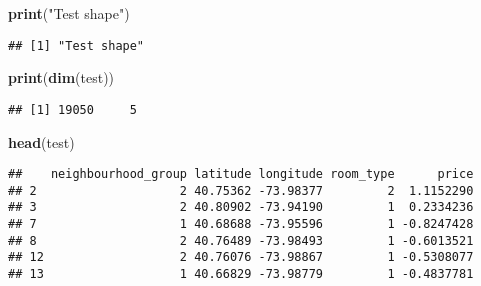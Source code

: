 \documentclass[
]{article}
\newenvironment{Shaded}{\begin{snugshade}}{\end{snugshade}}
\newcommand{\KeywordTok}[1]{\textcolor[rgb]{0.13,0.29,0.53}{\textbf{#1}}}
\newcommand{\NormalTok}[1]{#1}
\newcommand{\StringTok}[1]{\textcolor[rgb]{0.31,0.60,0.02}{#1}}
\begin{document}
\begin{Shaded}
\begin{Highlighting}[]
\KeywordTok{print}\NormalTok{(}\StringTok{"Test shape"}\NormalTok{)}
\end{Highlighting}
\end{Shaded}

\begin{verbatim}
## [1] "Test shape"
\end{verbatim}

\begin{Shaded}
\begin{Highlighting}[]
\KeywordTok{print}\NormalTok{(}\KeywordTok{dim}\NormalTok{(test))}
\end{Highlighting}
\end{Shaded}

\begin{verbatim}
## [1] 19050     5
\end{verbatim}

\begin{Shaded}
\begin{Highlighting}[]
\KeywordTok{head}\NormalTok{(test)}
\end{Highlighting}
\end{Shaded}

\begin{verbatim}
##    neighbourhood_group latitude longitude room_type      price
## 2                    2 40.75362 -73.98377         2  1.1152290
## 3                    2 40.80902 -73.94190         1  0.2334236
## 7                    1 40.68688 -73.95596         1 -0.8247428
## 8                    2 40.76489 -73.98493         1 -0.6013521
## 12                   2 40.76076 -73.98867         1 -0.5308077
## 13                   1 40.66829 -73.98779         1 -0.4837781
\end{verbatim}
\end{document}
